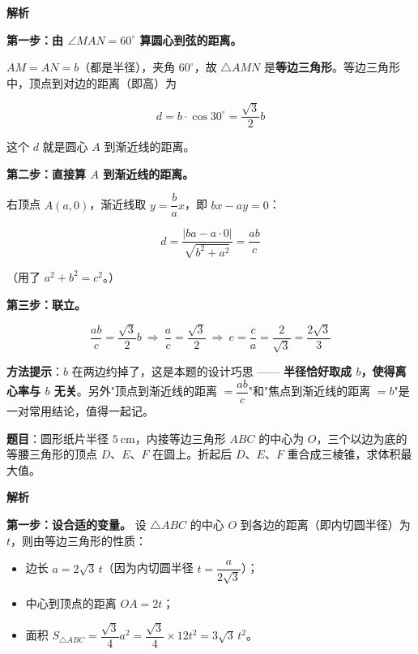 \textbf{解析}

\textbf{第一步：由 $\angle MAN=60^\circ$ 算圆心到弦的距离。}

$AM=AN=b$（都是半径），夹角 $60^\circ$，故 $\triangle AMN$ 是\textbf{等边三角形}。等边三角形中，顶点到对边的距离（即高）为

\[d=b\cdot\cos30^\circ=\frac{\sqrt3}2b\]

这个 $d$ 就是圆心 $A$ 到渐近线的距离。

\textbf{第二步：直接算 $A$ 到渐近线的距离。}

右顶点 $A(a,0)$，渐近线取 $y=\dfrac bax$，即 $bx-ay=0$：

\[d=\frac{|ba-a\cdot0|}{\sqrt{b^{2}+a^{2}}}=\frac{ab}{c}\]

（用了 $a^{2}+b^{2}=c^{2}$。）

\textbf{第三步：联立。}

\[\frac{ab}c=\frac{\sqrt3}2b\ \Longrightarrow\ \frac ac=\frac{\sqrt3}2\ \Longrightarrow\ e=\frac ca=\frac2{\sqrt3}=\frac{2\sqrt3}3\]


\begin{gktip}
\textbf{方法提示}：$b$ 在两边约掉了，这是本题的设计巧思 —— \textbf{半径恰好取成 $b$，使得离心率与 $b$ 无关}。另外"顶点到渐近线的距离 $=\dfrac{ab}c$"和"焦点到渐近线的距离 $=b$"是一对常用结论，值得一起记。
\end{gktip}

\par\medskip


\textbf{题目}：圆形纸片半径 $5\ \mathrm{cm}$，内接等边三角形 $ABC$ 的中心为 $O$，三个以边为底的等腰三角形的顶点 $D$、$E$、$F$ 在圆上。折起后 $D$、$E$、$F$ 重合成三棱锥，求体积最大值。

\begin{center}\end{center}

\textbf{解析}

\textbf{第一步：设合适的变量。} 设 $\triangle ABC$ 的中心 $O$ 到各边的距离（即内切圆半径）为 $t$，则由等边三角形的性质：

\begin{itemize}
\item 边长 $a=2\sqrt3\,t$（因为内切圆半径 $t=\dfrac a{2\sqrt3}$）；
\item 中心到顶点的距离 $OA=2t$；
\item 面积 $S_{\triangle ABC}=\dfrac{\sqrt3}4a^{2}=\dfrac{\sqrt3}4\times12t^{2}=3\sqrt3\,t^{2}$。
\end{itemize}

